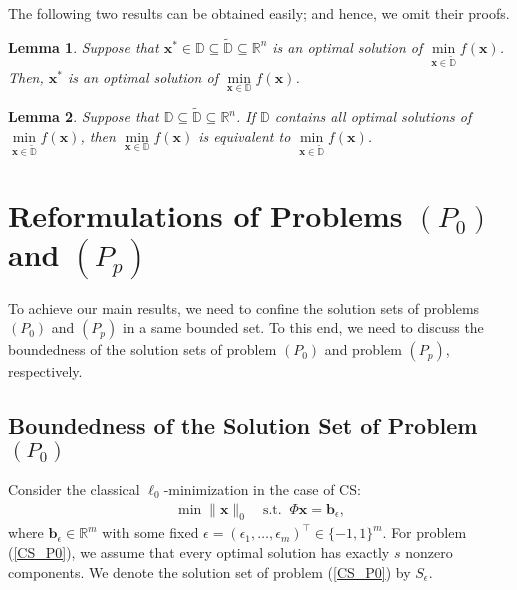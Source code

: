 \documentclass[12pt]{article}
\newtheorem{Lemma}{Lemma}[part]
\begin{document}
The following two results can be obtained easily; and hence, we omit their proofs.

\begin{Lemma}\label{add-lem2-1}
Suppose that $\mathbf{x}^*\in\mathbb{D}\subseteq \tilde{\mathbb{D}}\subseteq \mathbb{R}^n$ is an optimal solution of $\min\limits_{\mathbf{x}\in \tilde{\mathbb{D}}}f(\mathbf{x})$. Then, $\mathbf{x}^*$ is an optimal solution of $\min\limits_{\mathbf{x}\in \mathbb{D}}f(\mathbf{x})$.
\end{Lemma}

\begin{Lemma}\label{contains-all-solutions}
Suppose that $\mathbb{D}\subseteq \tilde{\mathbb{D}}\subseteq \mathbb{R}^n$. If $\mathbb{D}$ contains all optimal solutions of $\min\limits_{\mathbf{x}\in \tilde{\mathbb{D}}}f(\mathbf{x})$, then $\min\limits_{\mathbf{x}\in \mathbb{D}}f(\mathbf{x})$ is equivalent to $\min\limits_{\mathbf{x}\in \tilde{\mathbb{D}}}f(\mathbf{x})$.
\end{Lemma}


\section{Reformulations of Problems $(P_0)$ and $(P_p)$}
\setcounter{equation}{0} \setcounter{Assumption}{0}
\setcounter{Theorem}{0} \setcounter{Proposition}{0}
\setcounter{Corollary}{0} \setcounter{Lemma}{0}
\setcounter{Definition}{0} \setcounter{Remark}{0}
\setcounter{Algorithm}{0}  \setcounter{Example}{0}


\hspace{4mm} To achieve our main results, we need to confine the solution sets of problems $(P_0)$ and $(P_p)$ in a same bounded set. To this end, we need to discuss the boundedness of the solution sets of problem $(P_0)$ and problem $(P_p)$, respectively.

\subsection{Boundedness of the Solution Set of Problem $(P_0)$}

\hspace{4mm} Consider the classical $\ell_0$-minimization in the case of CS:
\begin{eqnarray}\label{CS_P0}
\min \|\mathbf{x}\|_0\quad \textrm{s.t.}\;\; \Phi\mathbf{x}=\mathbf{b}_\epsilon,
\end{eqnarray}
where $\mathbf{b}_\epsilon\in\mathbb{R}^m$
with some fixed $\epsilon=(\epsilon_1,\ldots,\epsilon_m)^{\top}\in\{-1,1\}^m$. For
problem (\ref{CS_P0}), we assume that every optimal solution has exactly $s$
nonzero components. We denote the solution set of problem (\ref{CS_P0}) by $S_\epsilon$.
\end{document}
